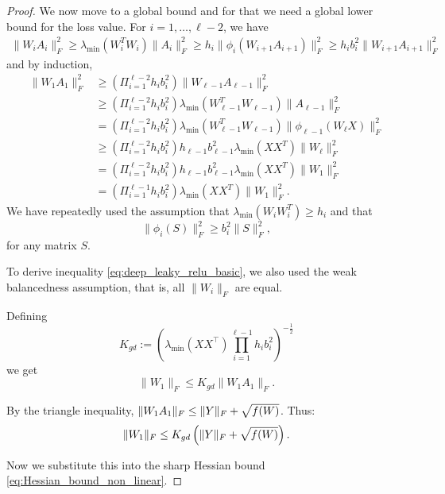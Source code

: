 \documentclass[a4paper,11pt]{article}
\DeclarePairedDelimiter{\norm}{\|}{\|}
\newcommand{\1}{\mathbbm{1}}
\theoremstyle{plain}
\begin{document}
\begin{proof}
We now move to a global bound and for that we need a global lower bound for the loss value. For $i=1 ,\dots, \ell-2$, we have
\begin{align*}
     \|W_i A_i\|_F^2 \geq \lambda_{\min}(W_i^T W_i) \|A_i\|_F^2 \geq h_i \|\phi_i(W_{i+1} A_{i+1})\|^2_F \geq h_i b_i^2 \|W_{i+1} A_{i+1}\|_F^2
\end{align*}
and by induction,
\begin{align}
\label{eq:deep_leaky_relu_basic}
    \|W_1 A_1\|_F^2 & \geq \nonumber\left(\Pi_{i=1}^{\ell-2} h_i b_i^2 \right) \|W_{\ell-1} A_{\ell-1}\|_F^2 \\ & \geq \nonumber\left(\Pi_{i=1}^{\ell-2} h_i b_i^2 \right) \lambda_{\min}(W_{\ell-1}^T W_{\ell-1}) \|A_{\ell-1}\|_F^2 \\ & = \nonumber \left(\Pi_{i=1}^{\ell-2} h_i b_i^2 \right) \lambda_{\min}(W_{\ell-1}^T W_{\ell-1}) \|\phi_{\ell-1}(W_{\ell} X)\|_F^2 \\ & \geq \nonumber \left(\Pi_{i=1}^{\ell-2} h_i b_i^2 \right) h_{\ell-1} b_{\ell-1}^2 \lambda_{\min}(X X^T) \|W_{\ell}\|_F^2 \\ & = \nonumber\left(\Pi_{i=1}^{\ell-2} h_i b_i^2 \right) h_{\ell-1} b_{\ell-1}^2 \lambda_{\min}(X X^T) \|W_1\|_F^2 \\ & = \left(\Pi_{i=1}^{\ell-1} h_i b_i^2 \right) \lambda_{\min}(X X^T) \|W_1\|_F^2.
\end{align}
We have repeatedly used the assumption that $\lambda_{\min}(W_i W_i^T) \geq h_i$ and that
\begin{equation*}
    \|\phi_i(S)\|^2_F \geq b_i^2 \|S\|_F^2,
\end{equation*}
for any matrix $S$.

To derive inequality \eqref{eq:deep_leaky_relu_basic}, we also used the weak balancedness assumption, that is, all $\|W_i\|_F$ are equal.

Defining \begin{equation}
\label{eq:K_gd_def}
K_{gd} := \left( \lambda_{\min}(XX^\top) \prod_{i=1}^{\ell-1} h_i b_i^2 \right)^{-\frac{1}{2}}
\end{equation}
we get
$$ \|W_1\|_F \leq K_{gd} \|W_1 A_1\|_F. $$

By the triangle inequality, $\norm{W_1 A_1}_F \le \norm{Y}_F + \sqrt{f(W)}$. Thus:
\begin{equation}
\label{eq:W1_bound_nonlinear}
\norm{W_1}_F \le K_{gd} \left( \norm{Y}_F + \sqrt{f(W)} \right).
\end{equation}

Now we substitute this into the sharp Hessian bound \eqref{eq:Hessian_bound_non_linear}.

\end{proof}
\end{document}
